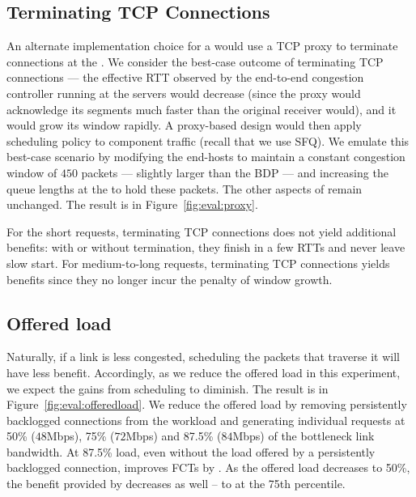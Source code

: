 
\subsection{Terminating TCP Connections}\label{s:eval:proxy}
An alternate implementation choice for a \name would use a TCP proxy to terminate connections at the \inbox. 
We consider the best-case outcome of terminating TCP connections --- the effective RTT observed by the end-to-end congestion controller running at the servers would decrease (since the proxy would acknowledge its segments much faster than the original receiver would), and it would grow its window rapidly.
A proxy-based design would then apply scheduling policy to component traffic (recall that we use SFQ).
We emulate this best-case scenario by modifying the end-hosts to maintain a constant congestion window of $450$ packets --- slightly larger than the BDP --- and increasing the queue lengths at the \inbox to hold these packets. The other aspects of \name remain unchanged.
The result is in Figure~\ref{fig:eval:proxy}.
%

%
For the short requests, terminating TCP connections does not yield additional benefits: with or without termination, they finish in a few RTTs and never leave slow start.
For medium-to-long requests, terminating TCP connections yields benefits since they no longer incur the penalty of window growth.



\subsection{Offered load}\label{s:eval:offeredload}
Naturally, if a link is less congested, scheduling the packets that traverse it will have less benefit. Accordingly, as we reduce the offered load in this experiment, we expect the gains from scheduling to diminish. The result is in Figure~\ref{fig:eval:offeredload}. We reduce the offered load by removing persistently backlogged connections from the workload and generating individual requests at 50\% ($48$Mbps), 75\% ($72$Mbps) and 87.5\% ($84$Mbps) of the bottleneck link bandwidth.
At 87.5\% load, even without the load offered by a persistently backlogged connection, \name improves FCTs by . 
As the offered load decreases to 50\%, the benefit provided by \name decreases as well -- to  at the 75th percentile.


